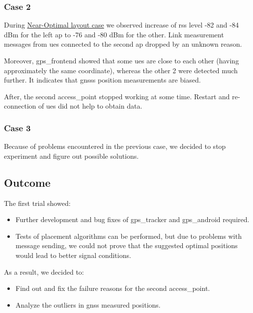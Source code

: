 \subsubsection{Case 2}

During \hyperref[near-optimal-layout]{Near-Optimal layout case} we observed increase of \gls{rss} level -82 and -84 dBm for the left \gls{ap} to -76 and -80 dBm for the other. Link measurement messages from \glspl{ue} connected to the second \gls{ap} dropped by an unknown reason.

Moreover, \gls{gps_frontend} showed that some \glspl{ue} are close to each other (having approximately the same coordinate), whereas the other 2 were detected much further. It indicates that \glspl{gnss} position measurements are biased.

After, the second \gls{access_point} stopped working at some time. Restart and re-connection of \glspl{ue} did not help to obtain data.


\subsubsection{Case 3}

Because of problems encountered in the previous case, we decided to stop experiment and figure out possible solutions.

\subsection{Outcome}

The first trial showed:

\begin{itemize}
\tightlist
\item
  Further development and bug fixes of \gls{gps_tracker}  and  \gls{gps_android} required.
\item
  Tests of placement algorithms can be performed, but due to problems with message sending, we could not prove that the suggested optimal positions would lead to better signal conditions.
\end{itemize}

As a result, we decided to:

\begin{itemize}
\tightlist
\item
  Find out and fix the failure reasons for the second \gls{access_point}.
\item
  Analyze the outliers in \gls{gnss} measured positions.
\end{itemize}
